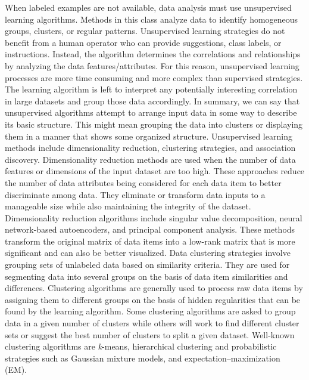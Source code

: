 When labeled examples are not available, data analysis must use unsupervised learning algorithms. Methods in this class analyze data to identify homogeneous groups, clusters, or regular patterns. Unsupervised learning strategies do not benefit from a human operator who can provide suggestions, class labels, or instructions. Instead, the algorithm determines the correlations and relationships by analyzing the data features/attributes. For this reason, unsupervised learning processes are more time consuming and more complex than supervised strategies. The learning algorithm is left to interpret any potentially interesting correlation in large datasets and group those data accordingly. In summary, we can say that unsupervised algorithms attempt to arrange input data in some way to describe its basic structure. This might mean grouping the data into clusters or displaying them in a manner that shows some organized structure. Unsupervised learning methods include dimensionality reduction, clustering strategies, and association discovery. Dimensionality reduction methods are used when the number of data features or dimensions of the input dataset are too high. These approaches reduce the number of data attributes being considered for each data item to better discriminate among data. They eliminate or transform data inputs to a manageable size while also maintaining the integrity of the dataset. Dimensionality reduction algorithms include singular value decomposition, neural network-based autoencoders, and principal component analysis. These methods transform the original matrix of data items into a low-rank matrix that is more significant and can also be better visualized. Data clustering strategies involve grouping sets of unlabeled data based on similarity criteria. They are used for segmenting data into several groups on the basis of data item similarities and differences. Clustering algorithms are generally used to process raw data items by assigning them to different groups on the basis of hidden regularities that can be found by the learning algorithm. Some clustering algorithms are asked to group data in a given number of clusters while others will work to find different cluster sets or suggest the best number of clusters to split a given dataset. Well-known clustering algorithms are \textit{k}-means, hierarchical clustering and probabilistic strategies such as Gaussian mixture models, and expectation--maximization (EM).

